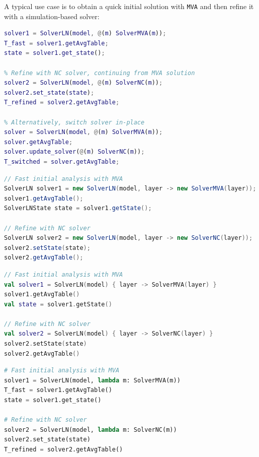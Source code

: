 A typical use case is to obtain a quick initial solution with \texttt{MVA} and then refine it with a simulation-based solver:
\begin{MATLAB}
\begin{lstlisting}[language = matlab]
% Fast initial analysis with MVA
solver1 = SolverLN(model, @(m) SolverMVA(m));
T_fast = solver1.getAvgTable;
state = solver1.get_state();

% Refine with NC solver, continuing from MVA solution
solver2 = SolverLN(model, @(m) SolverNC(m));
solver2.set_state(state);
T_refined = solver2.getAvgTable;

% Alternatively, switch solver in-place
solver = SolverLN(model, @(m) SolverMVA(m));
solver.getAvgTable;
solver.update_solver(@(m) SolverNC(m));
T_switched = solver.getAvgTable;
\end{lstlisting}
\end{MATLAB}
\begin{JAVA}
\begin{lstlisting}[language=java, basicstyle=\ttfamily\scriptsize]
// Fast initial analysis with MVA
SolverLN solver1 = new SolverLN(model, layer -> new SolverMVA(layer));
solver1.getAvgTable();
SolverLNState state = solver1.getState();

// Refine with NC solver
SolverLN solver2 = new SolverLN(model, layer -> new SolverNC(layer));
solver2.setState(state);
solver2.getAvgTable();
\end{lstlisting}
\end{JAVA}
\begin{KOTLIN}
\begin{lstlisting}[language=kotlin, basicstyle=\ttfamily\scriptsize]
// Fast initial analysis with MVA
val solver1 = SolverLN(model) { layer -> SolverMVA(layer) }
solver1.getAvgTable()
val state = solver1.getState()

// Refine with NC solver
val solver2 = SolverLN(model) { layer -> SolverNC(layer) }
solver2.setState(state)
solver2.getAvgTable()
\end{lstlisting}
\end{KOTLIN}
\begin{PYTHON}
\begin{lstlisting}[language=python]
# Fast initial analysis with MVA
solver1 = SolverLN(model, lambda m: SolverMVA(m))
T_fast = solver1.getAvgTable()
state = solver1.get_state()

# Refine with NC solver
solver2 = SolverLN(model, lambda m: SolverNC(m))
solver2.set_state(state)
T_refined = solver2.getAvgTable()
\end{lstlisting}
\end{PYTHON}


